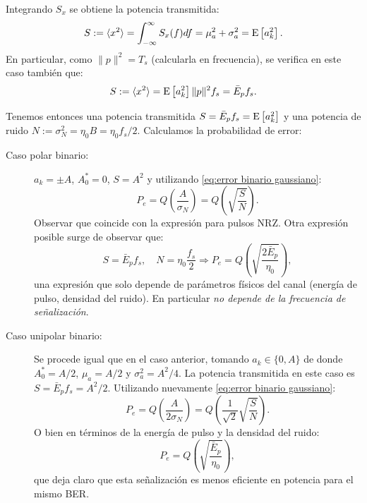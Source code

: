 \begin{ejemplo}
    Integrando $S_x$ se obtiene la potencia transmitida:
    \begin{equation*}
        S:=\langle x^2 \rangle = \int_{-\infty}^\infty S_x(f)df = \mu_a^2+\sigma_a^2 = \mathrm{E}\left[a_k^2\right].
    \end{equation*}
    En particular, como $\|p\|^2 = T_s$ (calcularla en frecuencia), se verifica en este caso también que:
    \begin{equation*}
        S:=\langle x^2 \rangle = \mathrm{E}\left[a_k^2\right] \|p\|^2 f_s = \bar{E}_p f_s.
    \end{equation*}

    Tenemos entonces una potencia transmitida $S=\bar{E}_p f_s = \mathrm{E}\left[a_k^2\right]$ y una potencia de ruido $N:=\sigma_N^2=\eta_0 B = \eta_0 f_s/2$. Calculamos la probabilidad de error:
    \begin{description}
        \item[Caso polar binario: ] $a_k = \pm A$, $A_0^*=0$, $S=A^2$ y utilizando \eqref{eq:error binario gaussiano}:
        \begin{equation*}
            P_e = Q\left(\frac{A}{\sigma_N}\right) = Q\left(\sqrt{\frac{S}{N}}\right).
        \end{equation*}
        Observar que coincide con la expresión para pulsos NRZ. Otra expresión posible surge de observar que:
        \begin{equation*}
            S = \bar{E}_p f_s , \quad N=\eta_0 \frac{f_s}{2} \Longrightarrow P_e = Q\left(\sqrt{\frac{2\bar{E}_p}{\eta_0}}\right),
        \end{equation*}
        una expresión que solo depende de parámetros físicos del canal (energía de pulso, densidad del ruido). En particular \emph{no depende de la frecuencia de señalización}.

        \item[Caso unipolar binario: ]  Se procede igual que en el caso anterior, tomando $a_k\in\{0,A\}$ de donde $A_0^* =A/2$, $\mu_a=A/2$ y $\sigma_a^2 = A^2/4$. La potencia transmitida en este caso es $S=\bar{E}_p f_s = A^2/2$. Utilizando nuevamente \eqref{eq:error binario gaussiano}:
        \begin{equation*}
            P_e = Q\left(\frac{A}{2\sigma_N}\right) = Q\left(\frac{1}{\sqrt{2}}\sqrt{\frac{S}{N}}\right).
        \end{equation*}
        O bien en términos de la energía de pulso y la densidad del ruido:
        \begin{equation*}
            P_e = Q\left(\sqrt{\frac{\bar{E}_p}{\eta_0}}\right),
        \end{equation*}
        que deja claro que esta señalización es menos eficiente en potencia para el mismo BER.
    \end{description}
\end{ejemplo}



